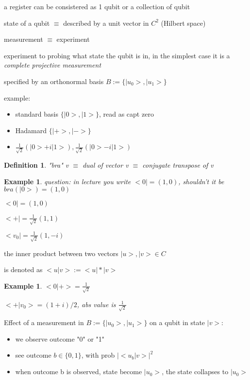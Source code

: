 \documentclass[10pt]{article}
\theoremstyle{break}
\newtheorem{ex}[thm]{Example}
\newtheorem{defn}{Definition}[subsection]
\begin{document}
a register can be consistered as 1 qubit or a collection of qubit

state of a qubit $\equiv$ described by a unit vector in $C^2$ (Hilbert space)

measurement $\equiv$ experiment

experiment to probing what state the qubit is in, in the simplest case 
it is a \emph{complete projective measurement} 

specified by an orthonormal basis $B:=\{|u_0>, |u_1>\}$

example: 
\begin{itemize}
    \item 
standard basis $\{|0>,|1>\}$, read as capt zero
    \item
Hadamard $\{|+>, |->\}$
    \item 
$\frac{1}{\sqrt{2}}(|0>+i|1>), \frac{1}{\sqrt{2}}(|0>-i|1>)$
\end{itemize}

\begin{defn}
    "bra" v $\equiv$ dual of vector v $\equiv$ conjugate transpose of v
\end{defn}

\begin{ex}
    question: in lecture you write $<0|=(1,0)$, shouldn't it be $bra(|0>)=(1,0)$

    $<0|=(1,0)$

    $<+|=\frac{1}{\sqrt{2}}(1,1)$

    $<v_0| = \frac{1}{\sqrt{2}}(1,-i)$
\end{ex}

the inner product between two vectors $|u>, |v> \in C$

is denoted as $<u|v>:=<u|*|v>$

\begin{ex}
    $<0|+>=\frac{1}{\sqrt{2}}$

    $<+|v_0>=(1+i)/2$, abs value is $\frac{1}{\sqrt{2}}$
\end{ex}

Effect of a measurement in $B:=\{|u_0>, |u_1>\}$
on a qubit in state $|v>$:
\begin{itemize}
    \item we observe outcome "0" or "1"
    \item see outcome $b\in\{0,1\}$, with prob $|<u_b|v>|^2$
    \item when outcome b is observed, state become $|u_0>$,
    the state collapses to $|u_0>$
\end{itemize}
\end{document}
